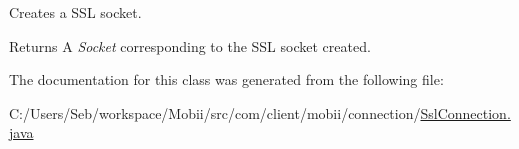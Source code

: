 Creates a S\-S\-L socket. 

\begin{DoxyReturn}{Returns}
A {\itshape Socket} corresponding to the S\-S\-L socket created. 
\end{DoxyReturn}


The documentation for this class was generated from the following file\-:\begin{DoxyCompactItemize}
\item 
C\-:/\-Users/\-Seb/workspace/\-Mobii/src/com/client/mobii/connection/\hyperlink{_ssl_connection_8java}{Ssl\-Connection.\-java}\end{DoxyCompactItemize}
